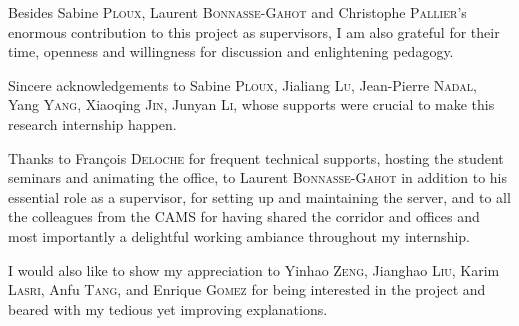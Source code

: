 \begin{acknowledgements}
    \addchaptertocentry{\acknowledgementname} %
    \vfil
    Besides Sabine \textsc{Ploux}, Laurent \textsc{Bonnasse-Gahot} and Christophe \textsc{Pallier}'s enormous contribution to this project as supervisors, I am also grateful for their time, openness and willingness for discussion and enlightening pedagogy.
    
    Sincere acknowledgements to Sabine \textsc{Ploux}, Jialiang \textsc{Lu}, Jean-Pierre \textsc{Nadal}, Yang \textsc{Yang}, Xiaoqing \textsc{Jin}, Junyan \textsc{Li}, whose supports were crucial to make this research internship happen. 

    Thanks to François \textsc{Deloche} for frequent technical supports, hosting the student seminars and animating the office, to Laurent \textsc{Bonnasse-Gahot} in addition to his essential role as a supervisor, for setting up and maintaining the server, and to all the colleagues from the CAMS for having shared the corridor and offices and most importantly a delightful working ambiance throughout my internship.

    I would also like to show my appreciation to Yinhao \textsc{Zeng}, Jianghao \textsc{Liu}, Karim \textsc{Lasri}, Anfu \textsc{Tang}, and Enrique \textsc{Gomez} for being interested in the project and beared with my tedious yet improving explanations. 
\end{acknowledgements}

\cleardoublepage